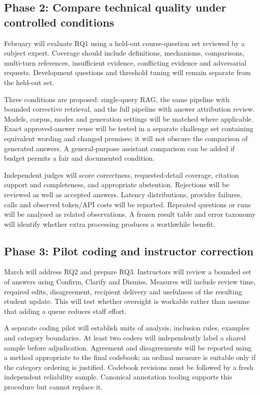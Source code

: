 \documentclass[11pt,a4paper]{article}
\begin{document}
\subsection{Phase 2: Compare technical quality under controlled conditions}
February will evaluate RQ1 using a held-out course-question set reviewed by a subject expert. Coverage should include definitions, mechanisms, comparisons, multi-turn references, insufficient evidence, conflicting evidence and adversarial requests. Development questions and threshold tuning will remain separate from the held-out set.

Three conditions are proposed: single-query RAG, the same pipeline with bounded corrective retrieval, and the full pipeline with answer attribution review. Models, corpus, modes and generation settings will be matched where applicable. Exact approved-answer reuse will be tested in a separate challenge set containing equivalent wording and changed premises; it will not obscure the comparison of generated answers. A general-purpose assistant comparison can be added if budget permits a fair and documented condition.

Independent judges will score correctness, requested-detail coverage, citation support and completeness, and appropriate abstention. Rejections will be reviewed as well as accepted answers. Latency distributions, provider failures, calls and observed token/API costs will be reported. Repeated questions or runs will be analysed as related observations. A frozen result table and error taxonomy will identify whether extra processing produces a worthwhile benefit.

\subsection{Phase 3: Pilot coding and instructor correction}
March will address RQ2 and prepare RQ3. Instructors will review a bounded set of answers using Confirm, Clarify and Dismiss. Measures will include review time, required edits, disagreement, recipient delivery and usefulness of the resulting student update. This will test whether oversight is workable rather than assume that adding a queue reduces staff effort.

A separate coding pilot will establish units of analysis, inclusion rules, examples and category boundaries. At least two coders will independently label a shared sample before adjudication. Agreement and disagreements will be reported using a method appropriate to the final codebook; an ordinal measure is suitable only if the category ordering is justified. Codebook revisions must be followed by a fresh independent reliability sample. Canonical annotation tooling supports this procedure but cannot replace it.
\end{document}
